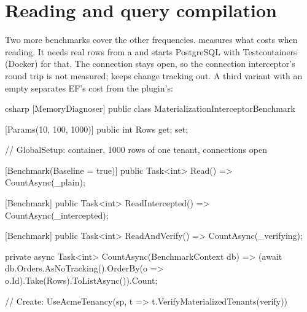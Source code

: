 \section{Reading and query compilation}

Two more benchmarks cover the other frequencies.
 measures what
 costs when reading.
It needs real rows from a  and starts PostgreSQL
with Testcontainers (Docker) for that. The connection stays open, so the connection
interceptor's round trip is not measured;  keeps
change tracking out. A third variant with an empty
 separates EF's cost from the plugin's:

\begin{sourcecode}{csharp}
[MemoryDiagnoser]
public class MaterializationInterceptorBenchmark
{
    [Params(10, 100, 1000)]
    public int Rows { get; set; }

    // GlobalSetup: container, 1000 rows of one tenant, connections open

    [Benchmark(Baseline = true)]
    public Task<int> Read() => CountAsync(_plain);

    [Benchmark]
    public Task<int> ReadIntercepted() => CountAsync(_intercepted);

    [Benchmark]
    public Task<int> ReadAndVerify() => CountAsync(_verifying);

    private async Task<int> CountAsync(BenchmarkContext db)
        => (await db.Orders.AsNoTracking().OrderBy(o => o.Id).Take(Rows).ToListAsync()).Count;

    // Create: UseAcmeTenancy(sp, t => t.VerifyMaterializedTenants(verify))
}
\end{sourcecode}

